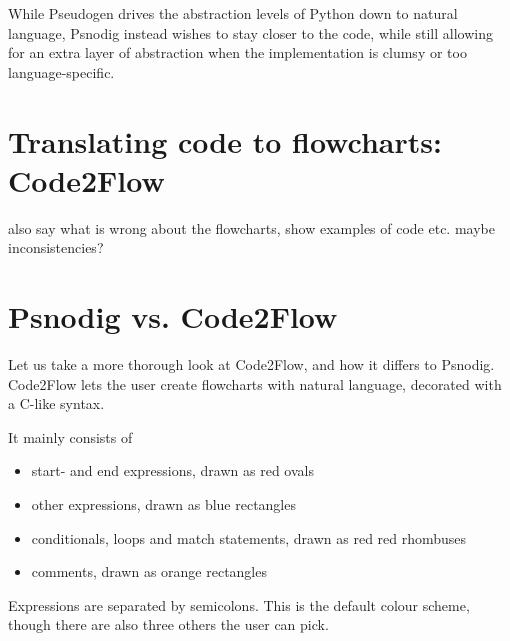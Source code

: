 While Pseudogen drives the abstraction levels of Python down to natural language, Psnodig instead wishes to stay closer to the code, while still allowing for an extra layer of abstraction when the implementation is clumsy or too language-specific.

\section{Translating code to flowcharts: Code2Flow}

also say what is wrong about the flowcharts, show examples of code etc. maybe inconsistencies?

\section{Psnodig vs. Code2Flow}

Let us take a more thorough look at Code2Flow, and how it differs to Psnodig. Code2Flow lets the user create flowcharts with natural language, decorated with a C-like syntax.

It mainly consists of

\begin{itemize}
    \item start- and end expressions, drawn as red ovals
    \item other expressions, drawn as blue rectangles
    \item conditionals, loops and match statements, drawn as red red rhombuses
    \item comments, drawn as orange rectangles
\end{itemize}

Expressions are separated by semicolons. This is the default colour scheme, though there are also three others the user can pick.

